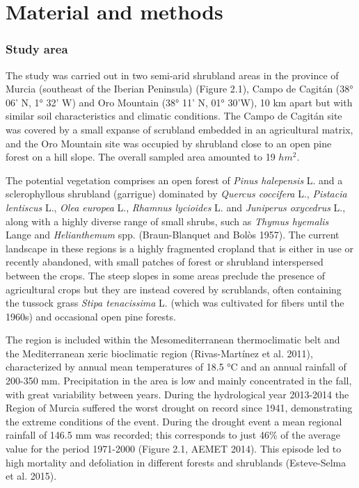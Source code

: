 \documentclass[11pt,twoside]{reedthesis}
\begin{document}
\section{Material and methods}\label{material-and-methods}

\subsubsection{Study area}\label{study-area}

The study was carried out in two semi-arid shrubland areas in the
province of Murcia (southeast of the Iberian Peninsula) (Figure 2.1),
Campo de Cagitán (38° 06' N, 1° 32' W) and Oro Mountain (38° 11' N, 01°
30'W), 10 km apart but with similar soil characteristics and climatic
conditions. The Campo de Cagitán site was covered by a small expanse of
scrubland embedded in an agricultural matrix, and the Oro Mountain site
was occupied by shrubland close to an open pine forest on a hill slope.
The overall sampled area amounted to 19 \(hm^2\).\par

The potential vegetation comprises an open forest of \emph{Pinus
halepensis} L. and a sclerophyllous shrubland (garrigue) dominated by
\emph{Quercus coccifera} L., \emph{Pistacia lentiscus} L., \emph{Olea
europea} L., \emph{Rhamnus lycioides} L. and \emph{Juniperus oxycedrus}
L., along with a highly diverse range of small shrubs, such as
\emph{Thymus hyemalis} Lange and \emph{Helianthemum} spp.
(Braun-Blanquet and Bolòs 1957). The current landscape in these regions
is a highly fragmented cropland that is either in use or recently
abandoned, with small patches of forest or shrubland interspersed
between the crops. The steep slopes in some areas preclude the presence
of agricultural crops but they are instead covered by scrublands, often
containing the tussock grass \emph{Stipa tenacissima} L. (which was
cultivated for fibers until the 1960s) and occasional open pine
forests.\par

The region is included within the Mesomediterranean thermoclimatic belt
and the Mediterranean xeric bioclimatic region (Rivas-Martínez et al.
2011), characterized by annual mean temperatures of 18.5 °C and an
annual rainfall of 200-350 mm. Precipitation in the area is low and
mainly concentrated in the fall, with great variability between years.
During the hydrological year 2013-2014 the Region of Murcia suffered the
worst drought on record since 1941, demonstrating the extreme conditions
of the event. During the drought event a mean regional rainfall of 146.5
mm was recorded; this corresponds to just 46\% of the average value for
the period 1971-2000 (Figure 2.1, AEMET 2014). This episode led to high
mortality and defoliation in different forests and shrublands
(Esteve-Selma et al. 2015).\par
\end{document}
